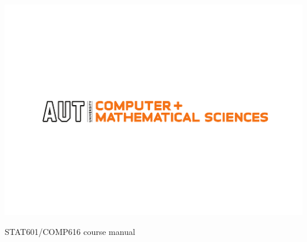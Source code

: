
\includegraphics{AUT_COMP_MATH_CMYK}

\begin{centering}
{\Huge STAT601/COMP616 course manual}
\end{centering}


